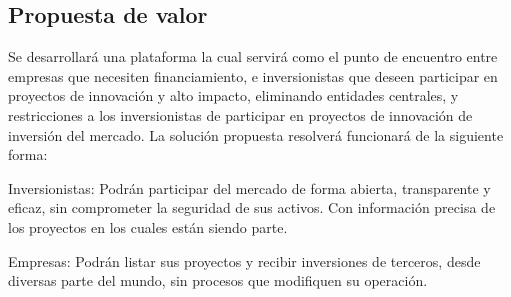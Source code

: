 \subsection{Propuesta de valor}
Se desarrollará  una plataforma la cual servirá  como el punto de encuentro entre  empresas que necesiten financiamiento, e inversionistas que deseen participar en proyectos  de innovación y alto impacto, eliminando entidades centrales, y restricciones a los inversionistas de participar en proyectos de innovación de inversión del mercado. La solución propuesta resolverá funcionará de la siguiente forma:

\vspace{4mm}
\noindent
Inversionistas: Podrán participar del mercado de forma abierta, transparente y  eficaz, sin comprometer la seguridad de sus activos. Con información precisa de los proyectos  en los cuales están siendo parte.

\vspace{4mm}
\noindent
Empresas: Podrán listar sus proyectos y recibir inversiones de  terceros,  desde diversas parte del mundo, sin procesos que modifiquen su operación.
